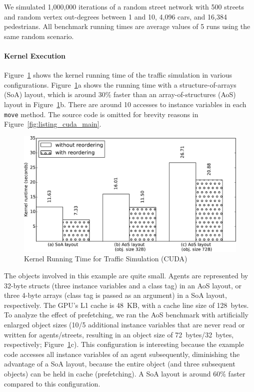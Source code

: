 \documentclass[preprint]{sigplanconf}
\begin{document}
We simulated 1,000,000 iterations of a random street network with 500 streets and random vertex out-degrees between 1 and 10, 4,096 cars, and 16,384 pedestrians. All benchmark running times are average values of 5 runs using the same random scenario.

\paragraph{Kernel Execution}
Figure~\ref{fig:bench_kernel} shows the kernel running time of the traffic simulation in various configurations. Figure~\ref{fig:bench_kernel}a shows the running time with a structure-of-arrays (SoA) layout, which is around 30\% faster than an array-of-structures (AoS) layout in Figure~\ref{fig:bench_kernel}b. There are around 10 accesses to instance variables in each \texttt{move} method. The source code is omitted for brevity reasons in Figure~\ref{fig:listing_cuda_main}.

\begin{figure}[!htp]
    \includegraphics[width=\columnwidth]{bench_1.pdf}
    \centering
    \caption{Kernel Running Time for Traffic Simulation (CUDA)}
    \label{fig:bench_kernel}
\end{figure}

The objects involved in this example are quite small. Agents are represented by 32-byte structs (three instance variables and a class tag) in an AoS layout, or three 4-byte arrays (class tag is passed as an argument) in a SoA layout, respectively. The GPU's L1 cache is 48~KB, with a cache line size of 128~bytes. To analyze the effect of prefetching, we ran the AoS benchmark with artificially enlarged object sizes (10/5 additional instance variables that are never read or written for agents/streets, resulting in an object size of 72~bytes/32~bytes, respectively; Figure~\ref{fig:bench_kernel}c). This configuration is interesting because the example code accesses all instance variables of an agent subsequently, diminishing the advantage of a SoA layout, because the entire object (and three subsequent objects) can be held in cache (prefetching). A SoA layout is around 60\% faster compared to this configuration.
\end{document}
